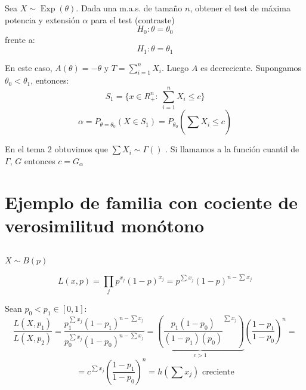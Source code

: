 \documentclass[openany]{book}
\begin{document}
\begin{example}
    Sea $ X \sim \operatorname{Exp}(\theta) $. Dada una m.a.s. de tamaño $ n $, obtener el test de máxima potencia y extensión $ \alpha $ para el test (contraste)
        $$ H_0: \theta = \theta_0 $$
    frente a:
    $$ H_1: \theta = \theta_1 $$
    
    En este caso, $ A(\theta) = -\theta $ y $ T = \sum\limits_{i=1}^{n}X_i $. Luego $ A $ es decreciente. Supongamos $ \theta_0<\theta_1 $, entonces:
    $$ S_1 = \{x \in R_{+}^{n}:\ \sum\limits_{i=1}^{n} X_i\leq  c\} $$
    $$ \alpha = P_{\theta=\theta_0}(X \in S_1) = P_{\theta_0}\left(\sum\limits_{}^{}X_i \leq  c\right)  $$

    En el tema 2 obtuvimos que $ \sum X_i \sim \Gamma() $ . Si llamamos a la función cuantil de $ \Gamma $, $ G $ entonces $ c = G_{\alpha} $
    
\end{example}

\section{Ejemplo de familia con cociente de verosimilitud monótono}

\begin{example}
    $ $

    $ X \sim B(p)$

    $$ L(x,p) = \prod_{j}^{} p^{x_j} (1-p)^{x_j} = p^{\sum\limits_{}^{}x_j} (1-p)^{n-\sum\limits_{}^{}x_j} $$

    Sean $ p_0<p_1 \in [0,1]$:
    $$ \dfrac{L(X,p_1)}{L(X,p_2)} = \dfrac{p_1^{\sum\limits_{}^{}x_j}(1-p_1)^{n-\sum x_j}}{p_0^{\sum x_j}(1-p_0)^{n-\sum x_j}} = \underbrace{\left( \dfrac{p_1(1-p_0)}{(1-p_1)(p_0)}^{\sum x_j} \right)}_{c>1} \left( \dfrac{1-p_1}{1-p_0} \right)^{n} = $$  
    $$=c ^{\sum x_j} \left( \dfrac{1-p_1}{1-p_0} \right)^{n} = h(\sum x_j) \text{ creciente} $$
\end{example}
\end{document}
